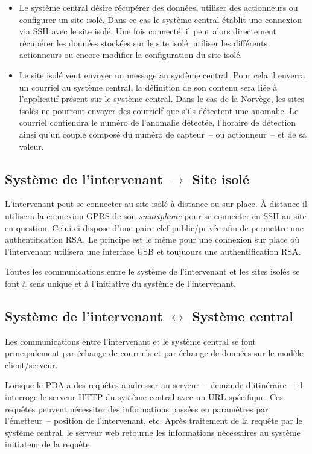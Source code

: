 \documentclass[a4paper, 11pt, final]{article}
\begin{document}
\begin{itemize}
\item Le système central désire récupérer des données, utiliser des actionneurs
ou configurer un site isolé. Dans ce cas le système central établit une
connexion via SSH avec le site isolé. Une fois connecté, il
peut alors directement récupérer les données stockées sur le site isolé,
utiliser les différents actionneurs ou encore modifier la configuration
du site isolé.
\item Le site isolé veut envoyer un message au système central. Pour cela
il enverra un courriel au système central, la définition de son contenu
sera liée à l'applicatif présent sur le système central. Dans le cas de la Norvège,
les sites isolés ne pourront envoyer des courrielf que s'ils détectent une anomalie.
Le courriel contiendra le numéro de l'anomalie détectée, l'horaire de détection
ainsi qu'un couple composé du numéro de capteur~-- ou actionneur~-- et de sa valeur.
\end{itemize}


\subsection{Système de l'intervenant $\rightarrow$ Site isolé}
L'intervenant peut se connecter au site isolé à distance ou sur place. À distance il utilisera la connexion GPRS de son \textit{smartphone} pour se connecter en SSH au site en question. Celui-ci dispose d'une paire clef public/privée afin de permettre une authentification RSA. Le principe est le même pour une connexion sur place où l'intervenant utilisera une interface USB et toujuours une authentification RSA.

Toutes les communications entre le système de l'intervenant et les sites isolés se font à sens unique et à l'initiative du système de l'intervenant.


\subsection{Système de l'intervenant $\leftrightarrow$ Système central}
Les communications entre l'intervenant et le système central se font principalement par
échange de courriels et par échange de données sur le modèle client/serveur.

Lorsque le PDA a des requêtes à adresser au serveur~-- demande d'itinéraire~-- il interroge le serveur HTTP du système central avec un URL spécifique. Ces requêtes peuvent nécessiter des informations passées en paramètres par l'émetteur~-- position de l'intervenant, etc. Après traitement de la requête par le système central, le serveur web retourne les informations nécessaires au système initiateur de la requête.
\end{document}
